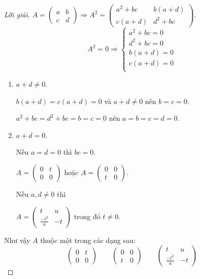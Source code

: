 \documentclass[class=nhvh-linear-algebra,crop=false]{standalone}
\begin{document}
\begin{proof}[Lời giải]
    $A = \begin{pmatrix}a & b \\ c & d\end{pmatrix}\Rightarrow A^{2} = \begin{pmatrix}a^{2}+bc & b(a+d) \\ c(a+d) & d^{2}+bc\end{pmatrix}$.
    \[
        A^{2} = 0
        \Rightarrow
        \begin{cases}
            a^{2}+bc = 0 \\
            d^{2}+bc = 0 \\
            b(a + d) = 0 \\
            c(a + d) = 0 \\
        \end{cases}
    \]
    \begin{enumerate}[label = Trường hợp \arabic*:,itemindent=2cm]
        \item $a + d \ne 0$.
              \par $b(a+d) = c(a+d) = 0$ và $a+d\ne 0$ nên $b = c = 0$.
              \par $a^{2} + bc = d^{2} + bc = b = c = 0$ nên $a = b = c = d = 0$.
        \item $a + d = 0$.
              \par Nếu $a = d = 0$ thì $bc = 0$.
              \par $A = \begin{pmatrix}0 & t \\ 0 & 0\end{pmatrix}$ hoặc $A = \begin{pmatrix}0 & 0 \\ t & 0\end{pmatrix}$.
              \par Nếu $a, d\ne 0$ thì
              \par $A = \begin{pmatrix}t & u \\ \frac{-t^{2}}{u} & -t\end{pmatrix}$ trong đó $t \ne 0$.
    \end{enumerate}
    \par Như vậy $A$ thuộc một trong các dạng sau:
    \[
        \begin{pmatrix}
            0 & t \\
            0 & 0
        \end{pmatrix}
        \qquad
        \begin{pmatrix}
            0 & 0 \\
            t & 0
        \end{pmatrix}
        \qquad
        \begin{pmatrix}
            t                & u  \\
            \frac{-t^{2}}{u} & -t
        \end{pmatrix}
    \]
\end{proof}
\end{document}
